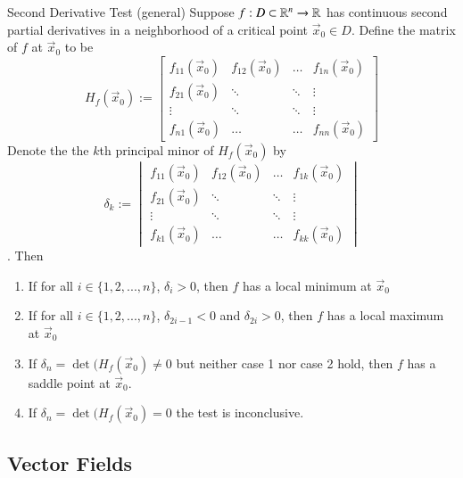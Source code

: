 \documentclass[12pt]{report}
\begin{document}
\begin{appendices}
    \begin{namthm}{Second Derivative Test (general)}
        Suppose $f:D \subset \mathbb R^n \rightarrow \mathbb R$ has continuous second partial derivatives in a neighborhood of a critical point $\vec{x}_0 \in D$. Define the  matrix of $f$ at $\vec{x}_0$ to be \begin{equation}
            H_f(\vec{x}_0) := \begin{bmatrix} f_{11}(\vec{x}_0) & f_{12}(\vec{x}_0) & \hdots & f_{1n}(\vec{x}_0) \\ f_{21}(\vec{x}_0) & \ddots & \ddots & \vdots \\ \vdots & \ddots & \ddots & \vdots \\ f_{n1}(\vec{x}_0) & \hdots & \hdots & f_{nn}(\vec{x}_0) \end{bmatrix}
        \end{equation}
        Denote the the $k$th principal minor of $H_f(\vec{x}_0)$ by \begin{equation}
            \delta_k := \begin{vmatrix} f_{11}(\vec{x}_0) & f_{12}(\vec{x}_0) & \hdots & f_{1k}(\vec{x}_0) \\ f_{21}(\vec{x}_0) & \ddots & \ddots & \vdots \\ \vdots & \ddots & \ddots & \vdots \\ f_{k1}(\vec{x}_0) & \hdots & \hdots & f_{kk}(\vec{x}_0) \end{vmatrix}
        \end{equation}. Then \begin{enumerate}
            \item If for all $i \in \{1,2,...,n\}$, $\delta_i > 0$, then $f$ has a local minimum at $\vec{x}_0$
            \item If for all $i \in \{1,2,...,n\}$, $\delta_{2i-1} <  0$ and $\delta_{2i} > 0$, then $f$ has a local maximum at $\vec{x}_0$
            \item If $\delta_n = \det(H_f(\vec{x}_0) \neq 0$ but neither case 1 nor case 2 hold, then $f$ has a saddle point at $\vec{x}_0$.
            \item If $\delta_n = \det(H_f(\vec{x}_0) = 0$ the test is inconclusive.
        \end{enumerate}
    \end{namthm}
    
    \subsection{Vector Fields}
    

\end{appendices}
\end{document}
